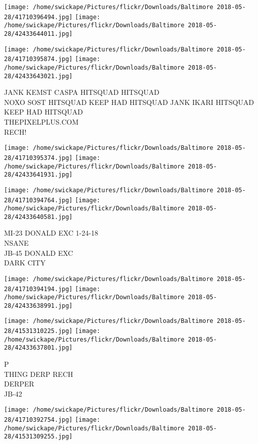 \documentclass[10pt,letterpaper]{article}
\begin{document}
\texttt{[image: /home/swickape/Pictures/flickr/Downloads/Baltimore 2018-05-28/41710396494.jpg]}
\texttt{[image: /home/swickape/Pictures/flickr/Downloads/Baltimore 2018-05-28/42433644011.jpg]}

\texttt{[image: /home/swickape/Pictures/flickr/Downloads/Baltimore 2018-05-28/41710395874.jpg]}
\texttt{[image: /home/swickape/Pictures/flickr/Downloads/Baltimore 2018-05-28/42433643021.jpg]}

JANK KEMST CASPA HITSQUAD HITSQUAD\\
NOXO SOST HITSQUAD KEEP HAD HITSQUAD JANK IKARI HITSQUAD KEEP HAD HITSQUAD\\
THEPIXELPLUS.COM\\
RECH!\\
\pagebreak

\texttt{[image: /home/swickape/Pictures/flickr/Downloads/Baltimore 2018-05-28/41710395374.jpg]}
\texttt{[image: /home/swickape/Pictures/flickr/Downloads/Baltimore 2018-05-28/42433641931.jpg]}

\texttt{[image: /home/swickape/Pictures/flickr/Downloads/Baltimore 2018-05-28/41710394764.jpg]}
\texttt{[image: /home/swickape/Pictures/flickr/Downloads/Baltimore 2018-05-28/42433640581.jpg]}

MI{-}23 DONALD EXC 1{-}24{-}18\\
NSANE\\
JB{-}45 DONALD EXC\\
DARK CITY\\
\pagebreak

\texttt{[image: /home/swickape/Pictures/flickr/Downloads/Baltimore 2018-05-28/41710394194.jpg]}
\texttt{[image: /home/swickape/Pictures/flickr/Downloads/Baltimore 2018-05-28/42433638991.jpg]}

\texttt{[image: /home/swickape/Pictures/flickr/Downloads/Baltimore 2018-05-28/41531310225.jpg]}
\texttt{[image: /home/swickape/Pictures/flickr/Downloads/Baltimore 2018-05-28/42433637801.jpg]}

P\\
THING DERP RECH\\
DERPER\\
JB{-}42\\
\pagebreak

\texttt{[image: /home/swickape/Pictures/flickr/Downloads/Baltimore 2018-05-28/41710392754.jpg]}
\texttt{[image: /home/swickape/Pictures/flickr/Downloads/Baltimore 2018-05-28/41531309255.jpg]}
\end{document}

